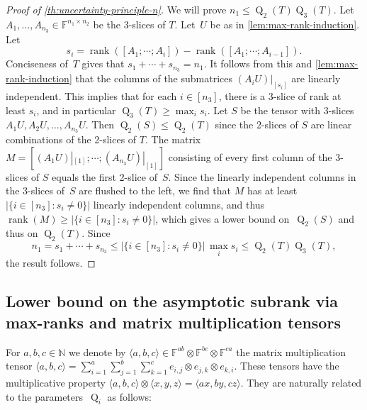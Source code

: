 \documentclass[11pt]{article}
\DeclareMathOperator{\subrank}{Q}
\newcommand{\FF}{\mathbb{F}}
\newcommand{\NN}{\mathbb{N}}
\DeclareMathOperator{\rank}{rank} \DeclareMathOperator{\col}{colspan}
\begin{document}
\begin{proof}[Proof of \autoref{th:uncertainty-principle-n}]
We will prove $n_1 \leq \subrank_2(T) \subrank_3(T)$.
Let $A_1, \ldots, A_{n_3} \in \FF^{n_1 \times n_2}$ be the $3$-slices of $T$.
Let~$U$ be as in \autoref{lem:max-rank-induction}.
Let 
\[
s_i = \rank([A_1; \cdots ; A_{i}]) - \rank([A_1; \cdots ; A_{i-1}]).
\]
Conciseness of~$T$ gives that $s_1 + \cdots + s_{n_3} = n_1$.
It follows from this and \autoref{lem:max-rank-induction} that the columns of the submatrices $(A_iU)|_{[s_i]}$ are linearly independent.
This implies that for each $i\in[n_3]$, 
there is a 3-slice of rank at least $s_i$,
%
and in particular $\subrank_3(T)\geq\max_i s_i$. %
%
Let $S$ be the tensor with 3-slices $A_1U, A_2U, \ldots, A_{n_3}U$. Then $\subrank_2(S) \leq \subrank_2(T)$ since the 2-slices of $S$ are linear combinations of the 2-slices of $T$. 
The matrix $M = [(A_1U)|_{[1]};\cdots ; (A_{n_3}U)|_{[1]}]$ consisting of every first column of the 3-slices of $S$ equals the first 2-slice of~$S$. Since the linearly independent columns in the 3-slices of~$S$ are flushed to the left, we find that $M$ has at least $|\{i\in [n_3]: s_i\ne 0\}|$ linearly independent columns, and thus $\rank(M) \geq |\{i\in [n_3]: s_i\ne 0\}|$,
%
%
which gives a lower bound on~$\subrank_2(S)$ and thus on $\subrank_2(T)$.
Since
\[
n_1  = s_1 + \cdots + s_{n_3}\leq |\{i\in [n_3]: s_i\ne 0\}|\, \max_i s_i \leq \subrank_2(T) \subrank_3(T),
\]
the result follows. %
%
%
%
%
%
%
%
%
%
%
%
\end{proof}
\setcounter{subsection}{3}\setcounter{theorem}{7}
\subsection{Lower bound on the asymptotic subrank via max-ranks and matrix multiplication tensors}\label{subsec:lb-mamu}

For $a,b,c \in \NN$ we denote by $\langle a,b,c\rangle \in \FF^{ab} \otimes \FF^{bc} \otimes \FF^{ca}$ the %
matrix multiplication tensor $\langle a,b,c \rangle = \sum_{i=1}^a \sum_{j=1}^b \sum_{k=1}^c e_{i,j} \otimes e_{j,k} \otimes e_{k,i}$. 
These tensors have the multiplicative property $\langle a,b,c\rangle \otimes \langle x,y,z\rangle = \langle ax, by, cz\rangle$. They are naturally related to the parameters~$\subrank_i$ as follows:
\end{document}
